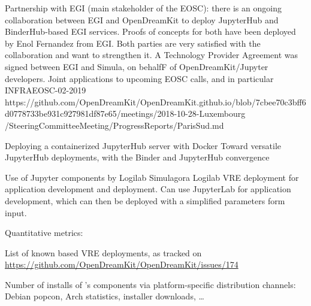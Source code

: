 \begin{Aim 1}
\begin{Aim 2}
\begin{itemize}
       Partnership with EGI (main stakeholder of the EOSC): there is an ongoing collaboration between EGI and OpenDreamKit to deploy
       JupyterHub and BinderHub-based EGI services. Proofs of concepts for both have been deployed by Enol Fernandez from EGI. Both parties
       are very satisfied with the collaboration and want to strengthen it. A Technology Provider Agreement was signed between EGI and
       Simula, on behalfF of OpenDreamKit/Jupyter developers. Joint applications to upcoming EOSC calls, and in particular INFRAEOSC-02-2019
       https://github.com/OpenDreamKit/OpenDreamKit.github.io/blob/7cbee70c3bff6d0778733be931c927981df87e65/meetings/2018-10-28-Luxembourg
       /SteeringCommitteeMeeting/ProgressReports/ParisSud.md
              
       Deploying a containerized JupyterHub server with Docker
       Toward versatile JupyterHub deployments, with the Binder and JupyterHub convergence
         
       Use of Jupyter components by Logilab
       Simulagora
       Logilab VRE deployment for application development and deployment.
       Can use JupyterLab for application development, which can then be deployed with a simplified parameters form input. %

         
  Quantitative metrics:
\begin{description}
\item List of known \ODK based VRE deployments, as tracked on \url{https://github.com/OpenDreamKit/OpenDreamKit/issues/174}
\item Number of installs of \ODK's components via platform-specific distribution channels: Debian popcon, Arch statistics, installer
  downloads, \dots
\end{description}


\end{itemize}
\end{Aim 2}
\end{Aim 1}
